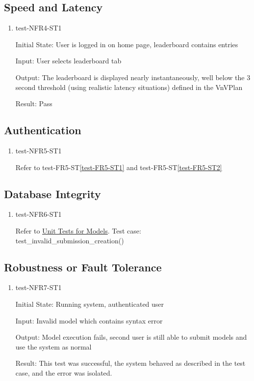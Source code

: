 \documentclass[12pt, titlepage]{article}
\begin{document}
\subsection{Speed and Latency}
\begin{enumerate}
\item{test-NFR4-ST1} \label{test-NFR4-ST1}

Initial State: User is logged in on home page, leaderboard contains entries

Input: User selects leaderboard tab

Output: The leaderboard is displayed nearly instantaneously, well below the 3 second threshold (using realistic latency situations) defined in the VnVPlan

Result: Pass

\end{enumerate}
\subsection{Authentication}
\begin{enumerate}
\item{test-NFR5-ST1} \label{test-NFR5-ST1}

Refer to test-FR5-ST\ref{test-FR5-ST1} and test-FR5-ST\ref{test-FR5-ST2}
\end{enumerate}
\subsection{Database Integrity}
\begin{enumerate}
\item{test-NFR6-ST1} \label{test-NFR6-ST1}

Refer to \href{https://github.com/AidanMariglia/SOCAlgoTestPlatform/blob/main/src/webserver/webserver/submissions/tests.py}{Unit Tests for Models}. Test case: test\_invalid\_submission\_creation() 

\end{enumerate}
\subsection{Robustness or Fault Tolerance}
\begin{enumerate}
\item{test-NFR7-ST1} \label{test-NFR7-ST1}


Initial State: Running system, authenticated user

Input: Invalid model which contains syntax error

Output: Model execution fails, second user is still able to submit models and use the system as normal

Result: This test was successful, the system behaved as described in the test case, and the error was isolated.

\end{enumerate}
\end{document}
